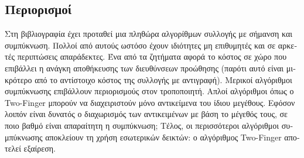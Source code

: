 \begin{greek}
\subsection{Περιορισμοί}
Στη βιβλιογραφία έχει προταθεί μια πληθώρα αλγορίθμων συλλογής
με σήμανση και συμπύκνωση. Πολλοί από αυτούς ωστόσο έχουν
ιδιότητες μη επιθυμητές και σε αρκετές περιπτώσεις απαράδεκτες.
Ένα από τα ζητήματα αφορά το κόστος σε χώρο που επιβάλλει
η ανάγκη αποθήκευσης των διευθύνσεων προώθησης (παρότι αυτό
είναι μικρότερο από το αντίστοιχο κόστος της συλλογής με
αντιγραφή). Μερικοί αλγόριθμοι συμπύκνωσης επιβάλλουν περιορισμούς
στον τροποποιητή. Απλοί αλγόριθμοι όπως ο Two-Finger μπορούν
να διαχειριστούν μόνο αντικείμενα του ίδιου μεγέθους. Εφόσον
λοιπόν είναι δυνατός ο διαχωρισμός των αντικειμένων με βάση
το μέγεθός τους, σε ποιο βαθμό είναι απαραίτητη η συμπύκνωση;
Τέλος, οι περισσότεροι αλγόριθμοι συμπύκνωσης αποκλείουν τη
χρήση εσωτερικών δεικτών: ο αλγόριθμος Two-Finger αποτελεί
εξαίρεση.

\end{greek}
